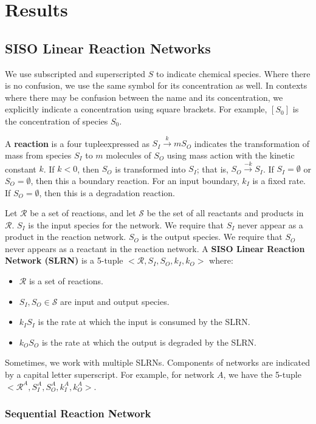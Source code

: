 \documentclass[unnumsec,webpdf,contemporary,large]{oup-authoring-template}%
\theoremstyle{thmstyleone}%
\theoremstyle{thmstyletwo}%
\theoremstyle{thmstylethree}%
\begin{document}
\section{Results}\label{results}
\subsection{SISO Linear Reaction Networks}

We use subscripted and superscripted $S$ to indicate chemical species. Where there is no confusion, we use the same symbol for its concentration as well. In contexts where there may be confusion between the name and its concentration, we explicitly indicate a concentration using square brackets. For example, $[S_0]$ is the concentration of species $S_0$.

A {\bf reaction} is a four tupleexpressed as $S_I \xrightarrow{k} m S_O$
indicates the transformation of mass from species $S_I$ to $m$ molecules of $S_O$
using mass action with the kinetic constant $k$. If $k < 0$,
then $S_O$ is transformed into $S_I$; that is, $S_O \xrightarrow{-k} S_I$.
If $S_I = \emptyset$ or $S_O = \emptyset$, then this a boundary reaction.
For an input boundary, $k_I$ is a fixed rate.
If $S_O = \emptyset$, then this is a degradation reaction.

Let $\mathcal{R}$ be a set of reactions, and let
$\mathcal{S}$ be the set of all reactants and products in $\mathcal{R}$.
$S_I$ is the input species for the network.
We require that $S_I$ never appear as a product in the reaction network.
$S_O$ is the output species.
We require that $S_O$ never appears as a reactant in the reaction network.
A {\bf SISO Linear Reaction Network (SLRN)} is
a 5-tuple
$<\mathcal{R}, S_I, S_O, k_I, k_O>$ where:
\begin{itemize}
    \item $\mathcal{R}$ is a set of reactions.
    \item 
    $S_I, S_O \in \mathcal{S}$ are input and output species.
    \item $k_I S_I$ is the rate at which the input is consumed
    by the SLRN.
    \item $k_O S_O$ is the rate at which the output is degraded by the SLRN.
\end{itemize}
Sometimes, we work with multiple SLRNs. Components of networks are indicated by a
capital letter superscript.
For example, for network $A$, we have the 5-tuple
$<\mathcal{R}^A, S^A_I, S^A_O, k^A_I, k^A_O>$.

\subsubsection{Sequential Reaction Network}
\end{document}

